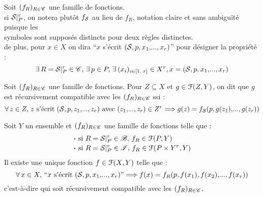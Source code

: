 			\eqskip{2mm}
			\begin{Notations}
				Soit \((f_R)_{R\in\scr{C}}\) une famille de fonctions. \\
				 \bdot si \(\cal{S}\constr{r}{P}\), on notera plutôt \(f_\cal{S}\) au lieu de \(f_R\), notation claire et sans ambiguïté puisque les \\ \listskip symboles sont supposés distincts pour deux règles distinctes. \\
				 \bdot de plus, pour \(x\in X\) on dira ``\(x\) s'écrit \((\cal{S},p,x_1,\!...,x_r)\)'' pour désigner la propriété :
					\[
						\exists\, R=\cal{S}\constr{r}{P} \in \scr{C},\,\exists \,p\in P,\,\exists\, (x_i)_{i\in[1..r]} \in X^r, x=(\cal{S},p,x_1,\!...,x_r)
					\]
			\end{Notations}
			\begin{Definition}
				Soit \((f_R)_{R\in\scr{C}}\) une famille de fonctions. Pour \(Z \subseteq X\) et \(g \in \escr{F}(Z,Y)\), on dit que \(g\) est récursivement compatible avec les \((f_R)_{R\in\scr{C}}\) ssi :
				\[
				\forall\, z\in Z,\, z \text{ s'écrit } (\cal{S},p,z_1,\!...,z_r) \text{ avec } (z_1,\!...,z_r) \in Z^r \Longrightarrow g(z) = f_\cal{S}(p,g(z_1),\!...,g(z_r))
				\]
			\end{Definition}
			
			\eqskip{1mm}
			\begin{Propriete}
				Soit \(Y\) un ensemble et \((f_R)_{R\in\scr{C}}\) une famille de fonctions telle que :
					\begin{align*}
						& \text{\bdot si } R = \cal{S}\constr{r}{P} \in \scr{B}, \, f_R \in \escr{F}(P,Y) \\[-0.5mm]
						& \text{\bdot si } R = \cal{S}\constr{r}{P} \in \scr{I},\, f_R \in \escr{F}(P \times Y^r,Y)
					\end{align*}
				Il existe une unique fonction \(f \in \escr{F}(X,Y)\) telle que : \eqskip{2mm}
					\[
					\forall\,x\in X, \, \text{``\(x\) s'écrit \((\cal{S},p,x_1,\!...,x_r)\)''} \Longrightarrow f(x) = f_R(p,f(x_1),f(x_2),\!...,f(x_r))
					\]
				c'est-à-dire qui soit récursivement compatible avec les \((f_R)_{R\in\scr{C}}\).
			\end{Propriete}
			
